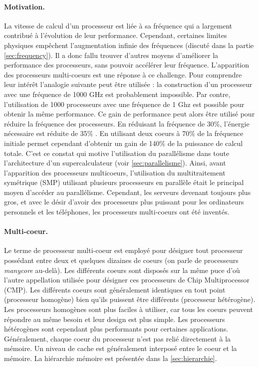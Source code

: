\paragraph{Motivation.}
La vitesse de calcul d'un processeur est liée à sa fréquence qui a largement contribué à l'évolution de leur performance. Cependant, certaines limites physiques empêchent l'augmentation infinie des fréquences (discuté dans la partie \ref{sec:frequency}). Il a donc fallu trouver d'autres moyens d'améliorer la performance des processeurs, sans pouvoir accélérer leur fréquence. L'apparition des processeurs multi-coeurs est une réponse à ce challenge. Pour comprendre leur intérêt l'analogie suivante peut être utilisée \cite{tanenbaum2016structured}: la construction d'un processeur avec une fréquence de 1000 GHz est probablement impossible. Par contre, l'utilisation de 1000 processeurs avec une fréquence de 1 Ghz est possible pour obtenir la même performance. Ce gain de performance peut alors être utilisé pour réduire la fréquence des processeurs. En réduisant la fréquence de 30\%, l'énergie nécessaire est réduite de 35\% \cite{mattsson2014haven}. En utilisant deux coeurs à 70\% de la fréquence initiale permet cependant d'obtenir un gain de 140\% de la puissance de calcul totale. C'est ce constat qui motive l'utilisation du parallélisme dans toute l'architecture d'un supercalculateur (voir \autoref{sec:parallelisme}). Ainsi, avant l'apparition des processeurs multicoeurs, l'utilisation du multitraitement symétrique (SMP) utilisant plusieurs processeurs en parallèle était le principal moyen d'accéder au parallélisme. Cependant, les serveurs devenant toujours plus gros, et avec le désir d'avoir des processeurs plus puissant pour les ordinateurs personnels et les téléphones, les processeurs multi-coeurs ont été inventés.


\paragraph{Multi-coeur.}
Le terme de processeur multi-coeur est employé pour désigner tout processeur possédant entre deux et quelques dizaines de coeurs (on parle de processeurs \textit{manycore} au-delà). Les différents coeurs sont disposés sur la même puce d'où l'autre appellation utilisée pour désigner ces processeurs de Chip Multiprocessor (CMP).
Les différents coeurs sont généralement identiques en tout point (processeur homogène) bien qu'ils puissent être différents (processeur hétérogène). Les processeurs homogènes sont plus faciles à utiliser, car tous les coeurs peuvent répondre au même besoin et leur design est plus simple. Les processeurs hétérogènes sont cependant plus performants pour certaines applications. 
Généralement, chaque coeur du processeur n'est pas relié directement à la mémoire. Un niveau de cache est généralement interposé entre le coeur et la mémoire. La hiérarchie mémoire est présentée dans la \autoref{sec:hierarchie}.

